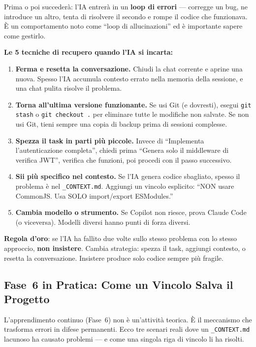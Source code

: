 Prima o poi succederà: l'IA entrerà in un \textbf{loop di errori} --- corregge un bug, ne introduce un altro, tenta di risolvere il secondo e rompe il codice che funzionava. È un comportamento noto come ``loop di allucinazioni'' ed è importante sapere come gestirlo.

\begin{warnbox}
\textbf{Le 5 tecniche di recupero quando l'IA si incarta:}
\begin{enumerate}
  \item \textbf{Ferma e resetta la conversazione.} Chiudi la chat corrente e aprine una nuova. Spesso l'IA accumula contesto errato nella memoria della sessione, e una chat pulita risolve il problema.
  \item \textbf{Torna all'ultima versione funzionante.} Se usi Git (e dovresti), esegui \texttt{git stash} o \texttt{git checkout .} per eliminare tutte le modifiche non salvate. Se non usi Git, tieni sempre una copia di backup prima di sessioni complesse.
  \item \textbf{Spezza il task in parti più piccole.} Invece di ``Implementa l'autenticazione completa'', chiedi prima ``Genera solo il middleware di verifica JWT'', verifica che funzioni, poi procedi con il passo successivo.
  \item \textbf{Sii più specifico nel contesto.} Se l'IA genera codice sbagliato, spesso il problema è nel \texttt{\_CONTEXT.md}. Aggiungi un vincolo esplicito: ``NON usare CommonJS. Usa SOLO import/export ESModules.''
  \item \textbf{Cambia modello o strumento.} Se Copilot non riesce, prova Claude Code (o viceversa). Modelli diversi hanno punti di forza diversi.
\end{enumerate}
\end{warnbox}

\begin{tipbox}
\textbf{Regola d'oro}: se l'IA ha fallito due volte sullo stesso problema con lo stesso approccio, \textbf{non insistere}. Cambia strategia: spezza il task, aggiungi contesto, o resetta la conversazione. Insistere produce solo codice sempre più fragile.
\end{tipbox}

\subsection{Fase~6 in Pratica: Come un Vincolo Salva il Progetto}

L'apprendimento continuo (Fase~6) non è un'attività teorica. È il meccanismo che trasforma errori in difese permanenti. Ecco tre scenari reali dove un \texttt{\_CONTEXT.md} lacunoso ha causato problemi --- e come una singola riga di vincolo li ha risolti.

